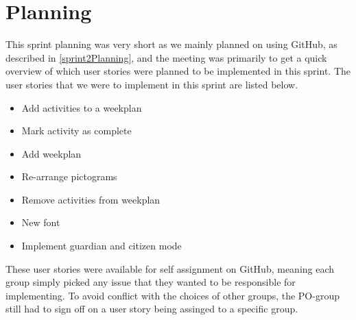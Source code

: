 \section{Planning}
This sprint planning was very short as we mainly planned on using GitHub, as described in \autoref{sprint2Planning}, and the meeting was primarily to get a quick overview of which user stories were planned to be implemented in this sprint.
The user stories that we were to implement in this sprint are listed below.

\begin{itemize}
\item Add activities to a weekplan
\item Mark activity as complete
\item Add weekplan
\item Re-arrange pictograms
\item Remove activities from weekplan
\item New font
\item Implement guardian and citizen mode
\end{itemize}

These user stories were available for self assignment on GitHub, meaning each group simply picked any issue that they wanted to be responsible for implementing.
To avoid conflict with the choices of other groups, the PO-group still had to sign off on a user story being assinged to a specific group.
